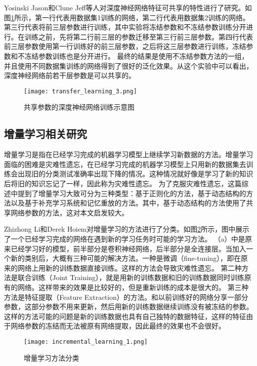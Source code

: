 Yosinski Jason和Clune Jeff等人\cite{yosinski_2014_NIPS}对深度神经网络特征可共享的特性进行了研究。如图\ref{fig:transfer_learning_3}所示，第一行代表用数据集1训练的网络，第二行代表用数据集2训练的网络。
第三行代表将前三层参数进行训练，其中实验将冻结参数和不冻结参数训练分开进行。在训练之前，先将第二行前三层的参数迁移至第三行前三层参数。第四行代表前三层参数使用第一行训练好的前三层参数，之后将这三层参数进行训练，冻结参数和不冻结参数训练也是分开进行。
最终的结果是使用不冻结参数方法的一组，并且使用不同数据集训练的网络得到了很好的泛化效果。从这个实验中可以看出，深度神经网络前若干层参数是可以共享的。
\begin{figure}
    \centering
    \texttt{[image: transfer\_learning\_3.png]}
    \caption{共享参数的深度神经网络训练示意图\cite{yosinski_2014_NIPS}}
    \label{fig:transfer_learning_3}
\end{figure}

\subsection{增量学习相关研究}
增量学习是指在已经学习完成的机器学习模型上继续学习新数据的方法。增量学习面临的困难是灾难性遗忘，在已经学习完成的机器学习模型上只用新的数据集去训练会出现旧的分类测试准确率出现下降的情况。这种情况就好像是学习了新的知识后将旧的知识忘记了一样，因此称为灾难性遗忘。
为了克服灾难性遗忘，这篇综述\cite{PARISI201954}中提到了增量学习大致可分为三种类型：基于正则化的方法，基于动态结构的方法以及基于补充学习系统和记忆重放的方法。其中，基于动态结构的方法使用了共享网络参数的方法，这对本文启发较大。

Zhizhong Li和Derek Hoiem\cite{8107520}对增量学习的方法进行了分类。如图\ref{fig:incremental_learning_1}所示，图中展示了一个已经学习完成的网络在遇到新的学习任务时可能的学习方法。
（a）中是原来已经学习好的模型，前半部分是卷积神经网络，后半部分是全连接层。当加入一个新的类别后，大概有三种可能的解决方法。一种是微调（fine-tuning），即在原来的网络上用新的训练数据直接训练。这样的方法会导致灾难性遗忘。
第二种方法是联合训练（Joint Training），就是用新的训练数据和旧的训练数据同时训练原有的网络。这样带来的效果是比较好的，但是重新训练的成本是很大的。
第三种方法是特征提取（Feature Extraction）的方法。和以前训练好的网络分享一部分参数，这部分参数不用来更新，然后用新的训练数据继续训练没有被冻结的参数。这样的方法可能的问题是新的训练数据也具有自己独特的数据特征，这样的特征由于网络参数的冻结而无法被原有网络提取，因此最终的效果也不会很好。
\begin{figure}
    \centering
    \texttt{[image: incremental\_learning\_1.png]}
    \caption{增量学习方法分类\cite{8107520}}
    \label{fig:incremental_learning_1}
\end{figure}

